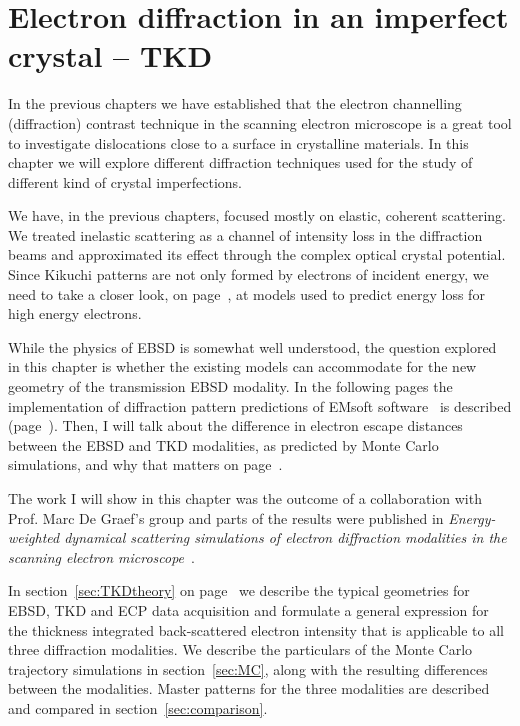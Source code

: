 \chapter{Electron diffraction in an imperfect crystal -- TKD}
\label{chap:TKD}
In the previous chapters we have established that the electron channelling (diffraction) contrast  technique in the scanning electron microscope is a great tool to investigate dislocations close to a surface in crystalline materials. In this chapter we will explore different diffraction techniques used for the study of different kind of crystal imperfections. 



We have, in the previous chapters, focused mostly on elastic, coherent scattering. We treated inelastic scattering as a channel of intensity loss in the diffraction beams and approximated its effect through the complex optical crystal potential. Since Kikuchi patterns are not only formed by electrons of incident energy, we need to take a closer look, on page~\pageref{sec:scatter}, at models used to predict energy loss for high energy electrons.


While the physics of EBSD is somewhat well understood, the question explored in this chapter is whether the existing models can accommodate for the new geometry of the transmission EBSD modality. In the following pages the implementation of diffraction pattern predictions of EMsoft software~\cite{EMsoftpaper} is described (page~\pageref{sec:TKDtheory}). Then, I will talk about the difference in electron escape distances between the EBSD and TKD modalities, as predicted by Monte Carlo simulations, and why that matters on page~\pageref{sec:MC}. 


The work I will show in this chapter was the outcome of a collaboration with Prof. Marc De Graef's group and parts of the results were published in \textit{Energy-weighted dynamical scattering simulations of electron diffraction modalities in the scanning electron microscope}~\cite{PascalTKD}.

In section~\ref{sec:TKDtheory} on page~\pageref{sec:TKDtheory} we describe the typical geometries for EBSD, TKD and ECP data acquisition and formulate a general expression for the thickness integrated back-scattered electron intensity that is applicable to all three diffraction modalities. We describe the particulars of the Monte Carlo trajectory simulations in section~\ref{sec:MC}, along with the resulting differences between the modalities. Master patterns for the three modalities are described and compared in section~\ref{sec:comparison}. 



